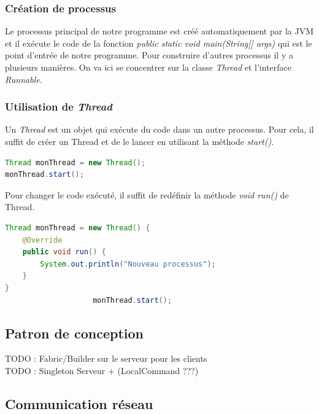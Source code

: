 \documentclass[a4paper, 12pt]{report}
\begin{document}
		\subsubsection{Création de processus}
			Le processus principal de notre programme est créé automatiquement par la JVM et il exécute le code de la fonction \emph{public static void main(String[] args)} qui est le point d'entrée de notre programme.
			Pour construire d'autres processus il y a plusieurs manières. On va ici se concentrer sur la classe \emph{Thread} et l'interface \emph{Runnable}.
		\subsubsection{Utilisation de \emph{Thread}}
			Un \emph{Thread} est un objet qui exécute du code dans un autre processus. Pour cela, il suffit de créer un Thread et de le lancer en utilisant la méthode \emph{start()}.
			\begin{mdframed}[backgroundcolor=light-gray, roundcorner=20pt,
				leftmargin=0, rightmargin=0, 
				innerleftmargin=20, linecolor=darkgray]
				\begin{lstlisting}[language=Java]
Thread monThread = new Thread();
monThread.start();
				\end{lstlisting}
			\end{mdframed}
			Pour changer le code exécuté, il suffit de redéfinir la méthode \emph{void run()} de Thread.
			 \begin{mdframed}[backgroundcolor=light-gray, roundcorner=20pt,
				leftmargin=0, rightmargin=0, 
				innerleftmargin=20, linecolor=darkgray]
				\begin{lstlisting}[language=Java]
Thread monThread = new Thread() {
	@Override
	public void run() {
		System.out.println("Nouveau processus");
	}
}
					monThread.start();
				\end{lstlisting}
			\end{mdframed}
	\subsection{Patron de conception}
		TODO : Fabric/Builder sur le serveur pour les clients\\
		TODO : Singleton Serveur + (LocalCommand ???)
	\subsection{Communication réseau}
\end{document}
